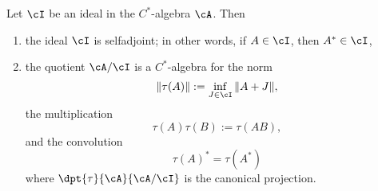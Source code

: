 \begin{theorem}
Let $\cI$ be an ideal in the $C^*$-algebra $\cA$. Then

\begin{enumerate}
\item the ideal $\cI$ is selfadjoint; in other words, if $A\in\cI$, then $A^*\in\cI$,  \label{enuni}
\item the quotient $\cA/\cI$ is a $C^*$-algebra for the norm \label{enunii}
\[ 
  \| \tau(A)\|:=\inf_{J\in\cI}\| A+J \| ,
\]
the multiplication
\[ 
  \tau(A)\tau(B):=\tau(AB),
\]
and the convolution
\[ 
  \tau(A)^*=\tau(A^*)
\]
where $\dpt{\tau}{\cA}{\cA/\cI}$ is the canonical projection.

\end{enumerate}
\label{tho_idautadjquo}
\end{theorem}

